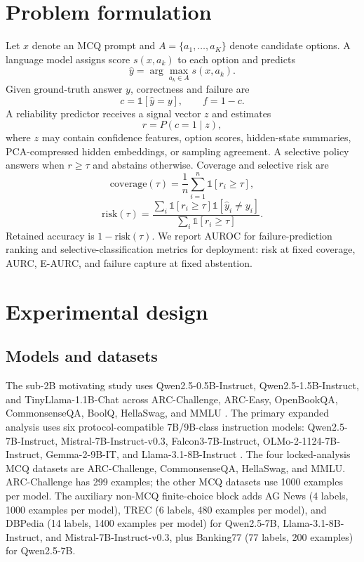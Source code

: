 \documentclass[preprint,12pt,authoryear]{elsarticle}
\begin{document}
\section{Problem formulation}
Let $x$ denote an MCQ prompt and $A=\{a_1,\ldots,a_K\}$ denote candidate options. A language model assigns score $s(x,a_k)$ to each option and predicts
\begin{equation}
\hat{y}=\arg\max_{a_k\in A} s(x,a_k).
\end{equation}
Given ground-truth answer $y$, correctness and failure are
\begin{equation}
c=\mathbb{1}[\hat{y}=y], \qquad f=1-c.
\end{equation}
A reliability predictor receives a signal vector $z$ and estimates
\begin{equation}
r=P(c=1\mid z),
\end{equation}
where $z$ may contain confidence features, option scores, hidden-state summaries, PCA-compressed hidden embeddings, or sampling agreement. A selective policy answers when $r\geq\tau$ and abstains otherwise. Coverage and selective risk are
\begin{equation}
\mathrm{coverage}(\tau)=\frac{1}{n}\sum_{i=1}^{n}\mathbb{1}[r_i\geq\tau],
\end{equation}
\begin{equation}
\mathrm{risk}(\tau)=\frac{\sum_i \mathbb{1}[r_i\geq\tau]\mathbb{1}[\hat{y}_i\neq y_i]}{\sum_i \mathbb{1}[r_i\geq\tau]}.
\end{equation}
Retained accuracy is $1-\mathrm{risk}(\tau)$. We report AUROC for failure-prediction ranking and selective-classification metrics for deployment: risk at fixed coverage, AURC, E-AURC, and failure capture at fixed abstention.

\section{Experimental design}
\subsection{Models and datasets}
The sub-2B motivating study uses Qwen2.5-0.5B-Instruct, Qwen2.5-1.5B-Instruct, and TinyLlama-1.1B-Chat across ARC-Challenge, ARC-Easy, OpenBookQA, CommonsenseQA, BoolQ, HellaSwag, and MMLU \citep{clark2018arc,mihaylov2018openbookqa,talmor2019commonsenseqa,clark2019boolq,zellers2019hellaswag,hendrycks2021mmlu,yang2024qwen,zhang2024tinyllama}. The primary expanded analysis uses six protocol-compatible 7B/9B-class instruction models: Qwen2.5-7B-Instruct, Mistral-7B-Instruct-v0.3, Falcon3-7B-Instruct, OLMo-2-1124-7B-Instruct, Gemma-2-9B-IT, and Llama-3.1-8B-Instruct \citep{yang2024qwen,jiang2023mistral,falcon3modelcard,olmo22025}. The four locked-analysis MCQ datasets are ARC-Challenge, CommonsenseQA, HellaSwag, and MMLU. ARC-Challenge has 299 examples; the other MCQ datasets use 1000 examples per model. The auxiliary non-MCQ finite-choice block adds AG News (4 labels, 1000 examples per model), TREC (6 labels, 480 examples per model), and DBPedia (14 labels, 1400 examples per model) for Qwen2.5-7B, Llama-3.1-8B-Instruct, and Mistral-7B-Instruct-v0.3, plus Banking77 (77 labels, 200 examples) for Qwen2.5-7B.
\end{document}
